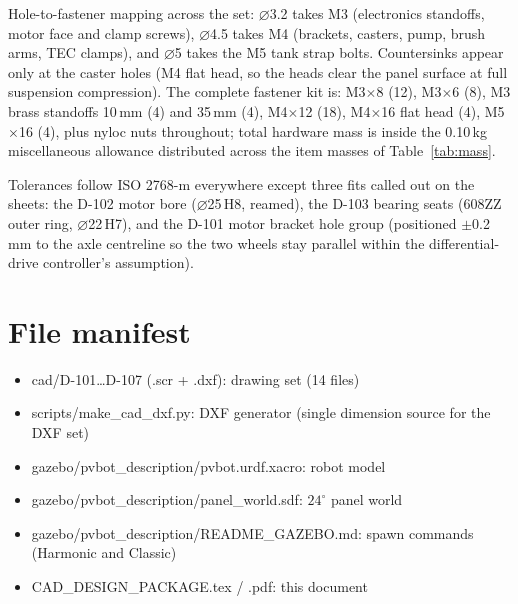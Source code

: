 \documentclass[11pt,a4paper]{article}
\newcommand{\fpath}[1]{{\ttfamily\small #1}}
\begin{document}
Hole-to-fastener mapping across the set: $\varnothing$3.2 takes M3
(electronics standoffs, motor face and clamp screws), $\varnothing$4.5
takes M4 (brackets, casters, pump, brush arms, TEC clamps), and
$\varnothing$5 takes the M5 tank strap bolts. Countersinks appear only at
the caster holes (M4 flat head, so the heads clear the panel surface at full
suspension compression). The complete fastener kit is: M3$\times$8 (12),
M3$\times$6 (8), M3 brass standoffs 10\,mm (4) and 35\,mm (4), M4$\times$12
(18), M4$\times$16 flat head (4), M5$\times$16 (4), plus nyloc nuts
throughout; total hardware mass is inside the 0.10\,kg miscellaneous
allowance distributed across the item masses of Table~\ref{tab:mass}.

Tolerances follow ISO 2768-m everywhere except three fits called out on the
sheets: the D-102 motor bore ($\varnothing$25\,H8, reamed), the D-103
bearing seats (608ZZ outer ring, $\varnothing$22\,H7), and the D-101 motor
bracket hole group (positioned $\pm$0.2\,mm to the axle centreline so the
two wheels stay parallel within the differential-drive controller's
assumption).

\section{File manifest}
\begin{itemize}\setlength\itemsep{0pt}
  \item \fpath{cad/D-101\dots D-107 (.scr + .dxf)}: drawing set (14 files)
  \item \fpath{scripts/make\_cad\_dxf.py}: DXF generator (single
        dimension source for the DXF set)
  \item \fpath{gazebo/pvbot\_description/pvbot.urdf.xacro}: robot model
  \item \fpath{gazebo/pvbot\_description/panel\_world.sdf}: $24^\circ$
        panel world
  \item \fpath{gazebo/pvbot\_description/README\_GAZEBO.md}: spawn
        commands (Harmonic and Classic)
  \item \fpath{CAD\_DESIGN\_PACKAGE.tex / .pdf}: this document
\end{itemize}



\end{document}
